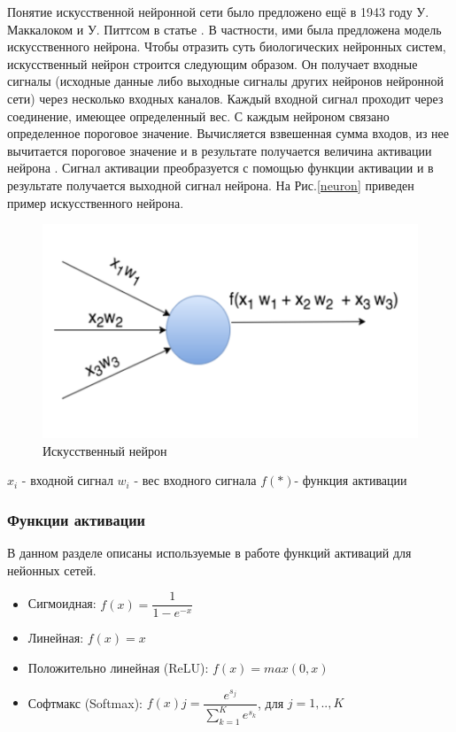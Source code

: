 Понятие искусственной нейронной сети было предложено ещё в 1943 году У. Маккалоком и У. Питтсом в статье \cite{neural_nets}. В частности, ими была предложена модель искусственного нейрона.
Чтобы отразить суть биологических нейронных систем, искусственный нейрон строится следующим образом. Он получает входные сигналы (исходные данные либо выходные сигналы других нейронов нейронной сети) через несколько входных каналов. Каждый входной сигнал проходит через соединение, имеющее определенный вес. С каждым нейроном связано определенное пороговое значение. Вычисляется взвешенная сумма входов, из нее вычитается пороговое значение и в результате получается величина активации нейрона . Сигнал активации преобразуется с помощью функции активации и в результате получается выходной сигнал нейрона.
На Рис.\ref{neuron} приведен пример искусственного нейрона.

\begin{figure}[h]
    \centering
    \includegraphics [width=\textwidth*2/3] {images/neuron.png}
    \caption{Искусственный нейрон}
    \label{fig:neuron}
\end{figure}

$x_i$ - входной сигнал
$w_i$ - вес входного сигнала $f(*)$- функция активации

\subsubsection{Функции активации}
В данном разделе описаны используемые в работе функций активаций для нейонных сетей.
\begin{itemize}
    \item Сигмоидная: $f(x) = \dfrac{1}{1-e^{-x}}$
    \item Линейная: $f(x) = x$
    \item Положительно линейная (ReLU): $f(x) = max(0, x)$
    \item  Софтмакс (Softmax): $f(x)j = \dfrac{e^{s_j}}{\sum^K_{k=1}e^{s_k}}$, для $j = 1, .., K$
\end{itemize}

